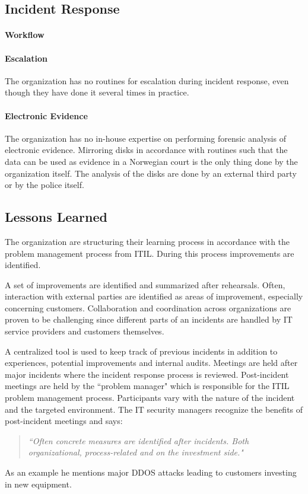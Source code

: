 \subsection{Incident Response}
\paragraph{Workflow}
\paragraph{Escalation}
The organization has no routines for escalation during incident response, even though they have done it several times in practice.

\paragraph{Electronic Evidence}
The organization has no in-house expertise on performing forensic analysis of electronic evidence. Mirroring disks in accordance with routines such that the data can be used as evidence in a Norwegian court is the only thing done by the organization itself. The analysis of the disks are done by an external third party or by the police itself.

\subsection{Lessons Learned}
The organization are structuring their learning process in accordance with the problem management process from ITIL. During this process improvements are identified. 

A set of improvements are identified and summarized after rehearsals. Often, interaction with external parties are identified as areas of improvement, especially concerning customers. Collaboration and coordination across organizations are proven to be challenging since different parts of an incidents are handled by IT service providers and customers themselves. 

A centralized tool is used to keep track of previous incidents in addition to experiences, potential improvements and internal audits. Meetings are held after major incidents where the incident response process is reviewed. Post-incident meetings are held by the ``problem manager" which is responsible for the ITIL problem management process. Participants vary with the nature of the incident and the targeted environment. The IT security managers recognize the benefits of post-incident meetings and says:
\begin{quote}
\textit{``Often concrete measures are identified after incidents. Both organizational, process-related and on the investment side."}
\end{quote}
As an example he mentions major DDOS attacks leading to customers investing in new equipment. 

